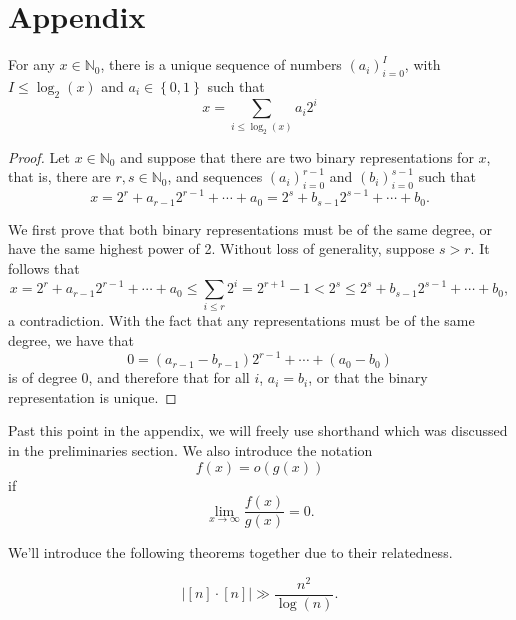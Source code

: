 \documentclass[12pt,reqno]{amsart}
\begin{document}


\section*{Appendix}

\begin{theorem*}
For any \(x \in \mathbb{N}_{0}  \), there is a unique sequence of numbers \(\left( a_{i}  \right) _{i = 0} ^{I} \), with
\(I \leq \log _{2} \left( x \right) \) and \(a_{i} \in \left\{ 0,1 \right\} \) such that
\[
    x = \sum _{i \leq \log _{2} \left( x \right) } a_{i} 2^{i}
\]
\end{theorem*}

\begin{proof}
Let \(x \in \mathbb{N}_{0}  \) and suppose that there are two binary representations for \(x\),
that is, there are \(r,s \in \mathbb{N}_{0}  \), and sequences \((a_{i} )_{i = 0} ^{r-1}\) and \(\left( b_{i}  \right) _{i = 0} ^{s - 1}\)
such that
\[
    x = 2^{r} + a_{r-1}2^{r-1} + \cdots + a_{0} = 2^{s} + b_{s - 1} 2^{s - 1} + \cdots + b_0  
.\]

We first prove that both binary representations must be of the same degree, or have
the same highest power of 2. Without loss of generality, suppose \(s > r\). It follows that
\[
    x = 2^{r} + a_{r-1} 2^{r-1} + \cdots + a_0 \leq \sum _{i \leq r} 2^{i} = 2^{r+1} - 1 < 2^{s} \leq 2^{s} + b_{s-1} 2^{s-1} + \cdots  + b_0
,\]
a contradiction. With the fact that any representations must be of the same degree,
we have that
\[
    0 = \left( a_{r-1} - b_{r-1}  \right) 2^{r-1} + \cdots + \left( a_0-b_0 \right)
\]
is of degree 0, and therefore that for all \(i\), \(a_{i} = b_{i} \), or that
the binary representation is unique.

\end{proof}

Past this point in the appendix, we will freely use shorthand which was discussed in the preliminaries
section. We also introduce the notation
\[
    f(x) = o(g(x))
\]
if
\[
    \lim_{x \to \infty} \frac{f(x)}{g(x)} = 0 
.\]

We'll introduce the following theorems together due to their relatedness.

\begin{theorem*}
\[
    \left\lvert [n] \cdot [n] \right\rvert \gg \frac{n ^{2}}{\log \left( n \right) }    
.\]
\end{theorem*}
\end{document}
